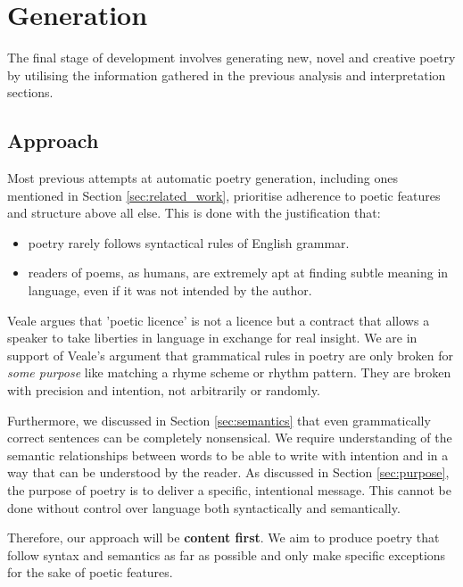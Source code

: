 \chapter{Generation}
\ifpdf
    \graphicspath{{Management/ManagementFigs/PNG/}{Management/ManagementFigs/PDF/}{Management/ManagementFigs/}}
\else
    \graphicspath{{Management/ManagementFigs/EPS/}{Management/ManagementFigs/}}
\fi

The final stage of development involves generating new, novel and creative poetry by utilising the information gathered in the previous analysis and interpretation sections.

\section{Approach}
Most previous attempts at automatic poetry generation, including ones mentioned in Section \ref{sec:related_work}, prioritise adherence to poetic features and structure above all else. This is done with the justification that:
\begin{itemize}
\item{poetry rarely follows syntactical rules of English grammar.}
\item{readers of poems, as humans, are extremely apt at finding subtle meaning in language, even if it was not intended by the author.}
\end{itemize}

Veale argues that 'poetic licence' is not a licence but a contract that allows a speaker to take liberties in language in exchange for real insight\cite{veale2013less}. We are in support of Veale's argument that grammatical rules in poetry are only broken for \textit{some purpose} like matching a rhyme scheme or rhythm pattern. They are broken with precision and intention, not arbitrarily or randomly.

Furthermore, we discussed in Section \ref{sec:semantics} that even grammatically correct sentences can be completely nonsensical. We require understanding of the semantic relationships between words to be able to write with intention and in a way that can be understood by the reader. As discussed in Section \ref{sec:purpose}, the purpose of poetry is to deliver a specific, intentional message. This cannot be done without control over language both syntactically and semantically.

Therefore, our approach will be \textbf{content first}. We aim to produce poetry that follow syntax and semantics as far as possible and only make specific exceptions for the sake of poetic features.

